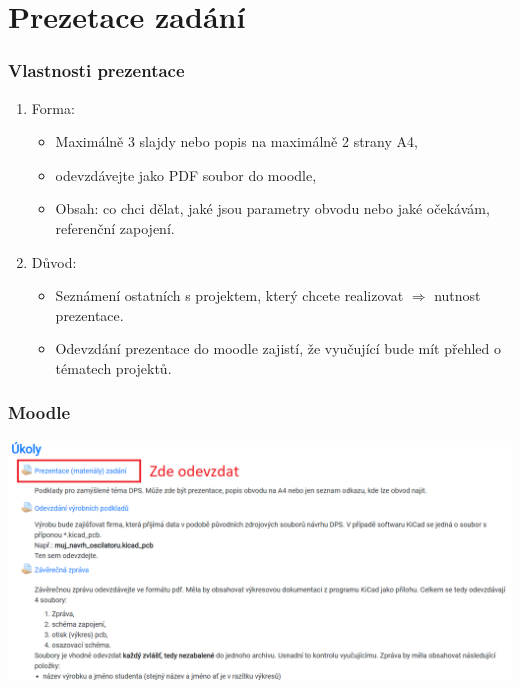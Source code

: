 \documentclass{beamer}
\begin{document}
\section{\texorpdfstring{Prezetace zadání}{Prezentace zadani}}
  \begin{frame}
    \frametitle{Vlastnosti prezentace}
		
		\begin{enumerate}
			\item Forma:
				\begin{itemize}
					\item Maximálně 3 slajdy nebo popis na maximálně 2 strany A4,
					\item odevzdávejte jako PDF soubor do moodle,
					\item Obsah: co chci dělat, jaké jsou parametry obvodu nebo jaké očekávám, referenční zapojení.
				\end{itemize}
			\item Důvod:
				\begin{itemize}
					\item Seznámení ostatních s projektem, který chcete realizovat $\Longrightarrow$ nutnost prezentace.
					\item Odevzdání prezentace do moodle zajistí, že vyučující bude mít přehled o tématech projektů.
				\end{itemize}
		\end{enumerate}
		\vspace{4mm}

  \end{frame}
  \begin{frame}
    \frametitle{Moodle}
    \begin{center}
      \includegraphics[width=\textwidth]{obr/moodle_ukoly.png}
    \end{center}
  \end{frame}
\end{document}
